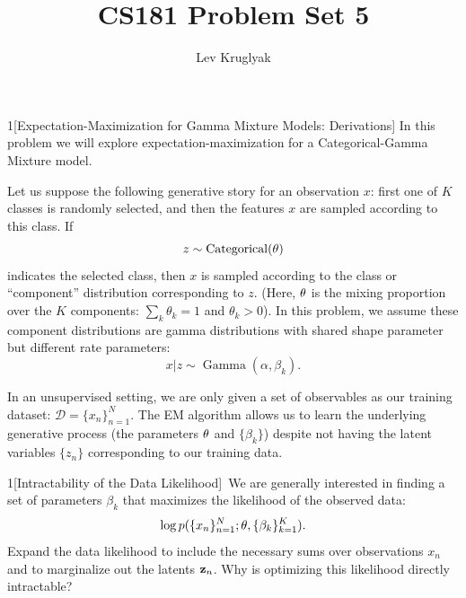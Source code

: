 \documentclass[expanded]{lkx_pset}
\title{CS181 Problem Set 5}
\author{Lev Kruglyak}
\begin{document}
\maketitle

\begin{problem}{1}[Expectation-Maximization for Gamma Mixture Models: Derivations]
In this problem we will explore expectation-maximization for a Categorical-Gamma Mixture model.
\end{problem}
\begin{solution}
	Let us suppose the following generative story for an observation $x$: first one of $K$ classes is randomly selected, and then the features $x$ are sampled according to this class. If $$z \sim \operatorname{Categorical}(\mathbf{\theta})$$ indicates the selected class, then $x$ is sampled according to the class or ``component'' distribution corresponding to $z$. (Here, $\mathbf{\theta}$ is the mixing proportion over the $K$ components: $\sum_k \theta_k = 1$ and $ \theta_k > 0$). In this problem, we assume these component distributions are gamma distributions with shared shape parameter but different rate parameters: $$x | z \sim \operatorname{Gamma}(\alpha, \beta_k).$$

	In an unsupervised setting, we are only given a set of observables as our training dataset: $\mathcal D = \{x_n\}_{n=1}^N$. The EM algorithm allows us to learn the underlying generative process (the parameters $\mathbf{\theta}$ and $\{\beta_k\}$) despite not having the latent variables $\{z_n\}$ corresponding to our training data.

	\begin{part}{1}[Intractability of the Data Likelihood]\
		We are generally interested in finding a set of parameters $\beta_k$ that
		maximizes the likelihood of the observed data: $$\log
			p(\{x_n\}^N_{n=1}; \mathbf{\theta}, \{\beta_k\}^K_{k = 1}).$$ Expand the data
		likelihood to include the necessary sums over observations
		$x_n$ and to marginalize out the latents
		$\mathbf{z}_n$. Why is optimizing this likelihood directly
		intractable?
	\end{part}


\end{solution}
\end{document}
